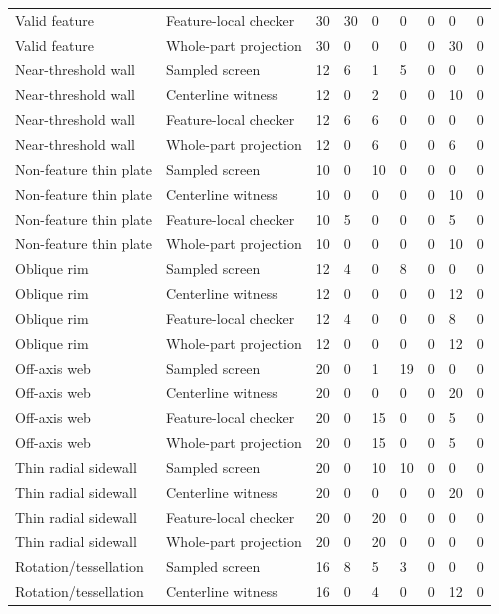 \begin{longtable}{lllllllll}
Valid feature & Feature-local checker & 30 & 30 & 0 & 0 & 0 & 0 & 0 \\
Valid feature & Whole-part projection & 30 & 0 & 0 & 0 & 0 & 30 & 0 \\
Near-threshold wall & Sampled screen & 12 & 6 & 1 & 5 & 0 & 0 & 0 \\
Near-threshold wall & Centerline witness & 12 & 0 & 2 & 0 & 0 & 10 & 0 \\
Near-threshold wall & Feature-local checker & 12 & 6 & 6 & 0 & 0 & 0 & 0 \\
Near-threshold wall & Whole-part projection & 12 & 0 & 6 & 0 & 0 & 6 & 0 \\
Non-feature thin plate & Sampled screen & 10 & 0 & 10 & 0 & 0 & 0 & 0 \\
Non-feature thin plate & Centerline witness & 10 & 0 & 0 & 0 & 0 & 10 & 0 \\
Non-feature thin plate & Feature-local checker & 10 & 5 & 0 & 0 & 0 & 5 & 0 \\
Non-feature thin plate & Whole-part projection & 10 & 0 & 0 & 0 & 0 & 10 & 0 \\
Oblique rim & Sampled screen & 12 & 4 & 0 & 8 & 0 & 0 & 0 \\
Oblique rim & Centerline witness & 12 & 0 & 0 & 0 & 0 & 12 & 0 \\
Oblique rim & Feature-local checker & 12 & 4 & 0 & 0 & 0 & 8 & 0 \\
Oblique rim & Whole-part projection & 12 & 0 & 0 & 0 & 0 & 12 & 0 \\
Off-axis web & Sampled screen & 20 & 0 & 1 & 19 & 0 & 0 & 0 \\
Off-axis web & Centerline witness & 20 & 0 & 0 & 0 & 0 & 20 & 0 \\
Off-axis web & Feature-local checker & 20 & 0 & 15 & 0 & 0 & 5 & 0 \\
Off-axis web & Whole-part projection & 20 & 0 & 15 & 0 & 0 & 5 & 0 \\
Thin radial sidewall & Sampled screen & 20 & 0 & 10 & 10 & 0 & 0 & 0 \\
Thin radial sidewall & Centerline witness & 20 & 0 & 0 & 0 & 0 & 20 & 0 \\
Thin radial sidewall & Feature-local checker & 20 & 0 & 20 & 0 & 0 & 0 & 0 \\
Thin radial sidewall & Whole-part projection & 20 & 0 & 20 & 0 & 0 & 0 & 0 \\
Rotation/tessellation & Sampled screen & 16 & 8 & 5 & 3 & 0 & 0 & 0 \\
Rotation/tessellation & Centerline witness & 16 & 0 & 4 & 0 & 0 & 12 & 0 \\

\end{longtable}
